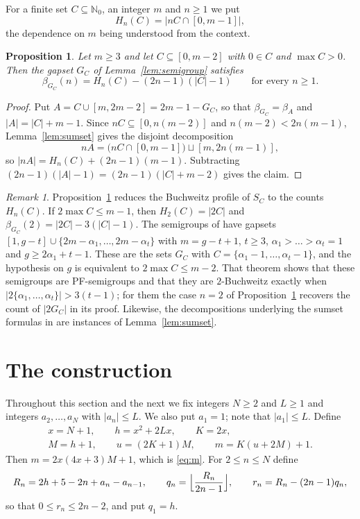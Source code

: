 \documentclass[11pt]{amsart}
\newtheorem{proposition}[theorem]{Proposition}
\theoremstyle{definition}
\theoremstyle{remark}
\newtheorem{remark}[theorem]{Remark}
\numberwithin{equation}{section}
\newcommand{\NN}{\mathbb{N}_0}
\begin{document}
For a finite set $C\subseteq\NN$, an integer $m$ and $n\ge1$ we put
\[
H_n(C)=|nC\cap[0,m-1]|,
\]
the dependence on $m$ being understood from the context.

\begin{proposition}\label{prop:beta}
Let $m\ge 3$ and let $C\subseteq[0,m-2]$ with $0\in C$ and $\max C>0$. Then the gapset $G_C$ of Lemma~\ref{lem:semigroup} satisfies
\[
\beta_{G_C}(n)=H_n(C)-(2n-1)(|C|-1)\qquad\text{for every } n\ge 1.
\]
\end{proposition}

\begin{proof}
Put $A=C\cup[m,2m-2]=2m-1-G_C$, so that $\beta_{G_C}=\beta_A$ and $|A|=|C|+m-1$. Since $nC\subseteq[0,n(m-2)]$ and $n(m-2)<2n(m-1)$, Lemma~\ref{lem:sumset} gives the disjoint decomposition
\[
nA=\bigl(nC\cap[0,m-1]\bigr)\sqcup[m,2n(m-1)],
\]
so $|nA|=H_n(C)+(2n-1)(m-1)$. Subtracting $(2n-1)(|A|-1)=(2n-1)(|C|+m-2)$ gives the claim.
\end{proof}

\begin{remark}\label{rem:GMTV}
Proposition~\ref{prop:beta} reduces the Buchweitz profile of $S_C$ to the counts $H_n(C)$. If $2\max C\le m-1$, then $H_2(C)=|2C|$ and $\beta_{G_C}(2)=|2C|-3(|C|-1)$. The semigroups of \cite[Theorem~4.1]{GMTV21} have gapsets $[1,g-t]\cup\{2m-\alpha_1,\dots,2m-\alpha_t\}$ with $m=g-t+1$, $t\ge 3$, $\alpha_1>\dots>\alpha_t=1$ and $g\ge 2\alpha_1+t-1$. These are the sets $G_C$ with $C=\{\alpha_1-1,\dots,\alpha_t-1\}$, and the hypothesis on $g$ is equivalent to $2\max C\le m-2$. That theorem shows that these semigroups are PF-semigroups and that they are $2$-Buchweitz exactly when $|2\{\alpha_1,\dots,\alpha_t\}|>3(t-1)$; for them the case $n=2$ of Proposition~\ref{prop:beta} recovers the count of $|2G_C|$ in its proof. Likewise, the decompositions underlying the sumset formulas in \cite[Propositions~3.4 and 3.5]{EGMV23} are instances of Lemma~\ref{lem:sumset}.
\end{remark}

\section{The construction}\label{sec:construction}

Throughout this section and the next we fix integers $N\ge 2$ and $L\ge 1$ and integers $a_2,\dots,a_N$ with $|a_n|\le L$. We also put $a_1=1$; note that $|a_1|\le L$. Define
\begin{equation}\label{eq:params}
\begin{gathered}
x=N+1,\qquad h=x^2+2Lx,\qquad K=2x,\\
M=h+1,\qquad u=(2K+1)M,\qquad m=K(u+2M)+1.
\end{gathered}
\end{equation}
Then $m=2x(4x+3)M+1$, which is \eqref{eq:m}. For $2\le n\le N$ define
\begin{equation}\label{eq:division}
R_n=2h+5-2n+a_n-a_{n-1},\qquad q_n=\Bigl\lfloor\frac{R_n}{2n-1}\Bigr\rfloor,\qquad r_n=R_n-(2n-1)q_n,
\end{equation}
so that $0\le r_n\le 2n-2$, and put $q_1=h$.
\end{document}
